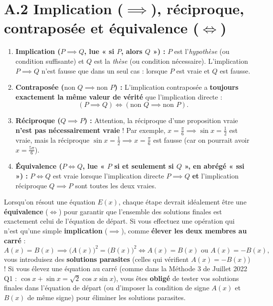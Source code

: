 \section*{A.2 Implication ($\implies$), réciproque, contraposée et équivalence ($\iff$)}

\begin{definition}
\begin{enumerate}
    \item \textbf{Implication ($P \implies Q$, lue « si $P$, alors $Q$ ») :} $P$ est l'\emph{hypothèse} (ou condition suffisante) et $Q$ est la \emph{thèse} (ou condition nécessaire). L'implication $P \implies Q$ n'est fausse que dans un seul cas : lorsque $P$ est vraie et $Q$ est fausse.
    \item \textbf{Contraposée ($\text{non } Q \implies \text{non } P$) :} L'implication contraposée a \textbf{toujours exactement la même valeur de vérité} que l'implication directe :
    \[
        \boxed{(P \implies Q) \iff (\text{non } Q \implies \text{non } P)}.
    \]
    \item \textbf{Réciproque ($Q \implies P$) :} Attention, la réciproque d'une proposition vraie \textbf{n'est pas nécessairement vraie} ! Par exemple, $x = \frac{\pi}{6} \implies \sin x = \frac{1}{2}$ est vraie, mais la réciproque $\sin x = \frac{1}{2} \implies x = \frac{\pi}{6}$ est fausse (car on pourrait avoir $x = \frac{5\pi}{6}$).
    \item \textbf{Équivalence ($P \iff Q$, lue « $P$ si et seulement si $Q$ », en abrégé « ssi ») :} $P \iff Q$ est vraie lorsque l'implication directe $P \implies Q$ \textbf{et} l'implication réciproque $Q \implies P$ sont toutes les deux vraies.
\end{enumerate}
\end{definition}

\begin{attention}
Lorsqu'on résout une équation $E(x)$, chaque étape devrait idéalement être une \textbf{équivalence} ($\iff$) pour garantir que l'ensemble des solutions finales est exactement celui de l'équation de départ.
Si vous effectuez une opération qui n'est qu'une simple \textbf{implication} ($\implies$), comme \textbf{élever les deux membres au carré} :
\[
    A(x) = B(x) \implies \bigl(A(x)\bigr)^2 = \bigl(B(x)\bigr)^2 \iff A(x) = B(x) \text{ ou } A(x) = -B(x),
\]
vous introduisez des \textbf{solutions parasites} (celles qui vérifient $A(x) = -B(x)$) ! Si vous élevez une équation au carré (comme dans la Méthode 3 de Juillet 2022 Q1 : $\cos x + \sin x = \sqrt{2}\cos x\sin x$), vous êtes \textbf{obligé} de tester vos solutions finales dans l'équation de départ (ou d'imposer la condition de signe $A(x)$ et $B(x)$ de même signe) pour éliminer les solutions parasites.
\end{attention}

